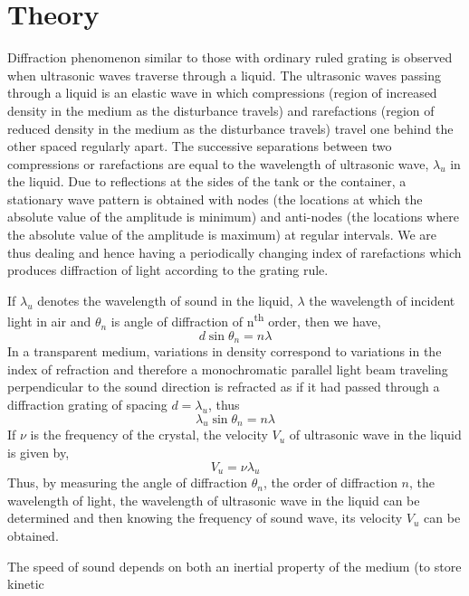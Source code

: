 \documentclass{article}
\begin{document}
\section{Theory}
\noindent 
Diffraction phenomenon similar to those with ordinary ruled grating is observed 
when ultrasonic waves traverse through a liquid. The ultrasonic waves passing through 
a liquid is an elastic wave in which compressions (region of increased density in the medium as the disturbance travels) and rarefactions (region of reduced density in the medium as the disturbance travels) travel one behind the other spaced regularly apart. The successive separations between two compressions or rarefactions are equal to the wavelength of ultrasonic wave, $\lambda_u$ in the liquid. Due to reflections at the sides of the tank or the container, a stationary wave pattern is obtained 
with nodes (the locations at which the absolute value of the amplitude is minimum) and anti-nodes (the locations where the absolute value of the amplitude is maximum) at regular intervals. We are thus dealing and hence having a periodically changing index of rarefactions which produces diffraction of light according to the grating rule.
\par
\noindent
If $\lambda_u$ denotes the wavelength of sound in the liquid, $\lambda$ the wavelength of incident light in air and $\theta_n$ is angle of diffraction of n\textsuperscript{th} order, then we have,
\begin{equation}
    d \sin \theta_n = n \lambda
\end{equation}
In a transparent medium, variations in density correspond to variations in the index of 
refraction and therefore a monochromatic parallel light beam traveling perpendicular to 
the sound direction is refracted as if it had passed through a diffraction grating of spacing $d = \lambda_u$, thus
\begin{equation}
    \lambda_u \sin \theta_n = n \lambda
\end{equation}
If $\nu$ is the frequency of the crystal, the velocity $V_u$ of ultrasonic wave in the 
liquid is given by,
\begin{equation}
    V_u = \nu \lambda_u
\end{equation}
Thus, by measuring the angle of diffraction $\theta_n$, the order of diffraction $n$, the wavelength of light, the wavelength of ultrasonic wave in the liquid can be determined and then knowing the frequency of sound wave, its velocity $V_u$ can be obtained.
\par
\noindent
The speed of sound depends on both an inertial property of the medium (to store kinetic 
\end{document}
